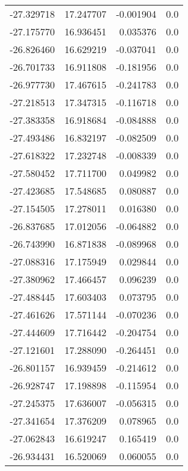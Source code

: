 \begin{tabular}{rrrr}
      -27.329718 &        17.247707 &   -0.001904 &   0.0 \\
      -27.175770 &        16.936451 &    0.035376 &   0.0 \\
      -26.826460 &        16.629219 &   -0.037041 &   0.0 \\
      -26.701733 &        16.911808 &   -0.181956 &   0.0 \\
      -26.977730 &        17.467615 &   -0.241783 &   0.0 \\
      -27.218513 &        17.347315 &   -0.116718 &   0.0 \\
      -27.383358 &        16.918684 &   -0.084888 &   0.0 \\
      -27.493486 &        16.832197 &   -0.082509 &   0.0 \\
      -27.618322 &        17.232748 &   -0.008339 &   0.0 \\
      -27.580452 &        17.711700 &    0.049982 &   0.0 \\
      -27.423685 &        17.548685 &    0.080887 &   0.0 \\
      -27.154505 &        17.278011 &    0.016380 &   0.0 \\
      -26.837685 &        17.012056 &   -0.064882 &   0.0 \\
      -26.743990 &        16.871838 &   -0.089968 &   0.0 \\
      -27.088316 &        17.175949 &    0.029844 &   0.0 \\
      -27.380962 &        17.466457 &    0.096239 &   0.0 \\
      -27.488445 &        17.603403 &    0.073795 &   0.0 \\
      -27.461626 &        17.571144 &   -0.070236 &   0.0 \\
      -27.444609 &        17.716442 &   -0.204754 &   0.0 \\
      -27.121601 &        17.288090 &   -0.264451 &   0.0 \\
      -26.801157 &        16.939459 &   -0.214612 &   0.0 \\
      -26.928747 &        17.198898 &   -0.115954 &   0.0 \\
      -27.245375 &        17.636007 &   -0.056315 &   0.0 \\
      -27.341654 &        17.376209 &    0.078965 &   0.0 \\
      -27.062843 &        16.619247 &    0.165419 &   0.0 \\
      -26.934431 &        16.520069 &    0.060055 &   0.0 \\

\end{tabular}
